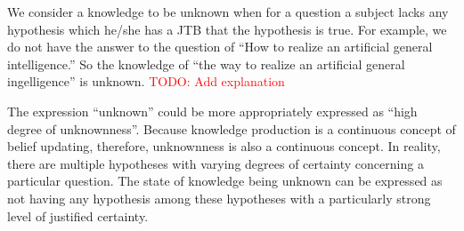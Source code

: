 We consider a knowledge to be unknown when for a question a subject lacks any hypothesis which he/she has a JTB that the hypothesis is true. For example, we do not have the answer to the question of ``How to realize an artificial general intelligence.'' So the knowledge of ``the way to realize an artificial general ingelligence'' is unknown. \textcolor{red}{TODO: Add explanation}

The expression ``unknown'' could be more appropriately expressed as ``high degree of unknownness''. Because knowledge production is a continuous concept of belief updating, therefore, unknownness is also a continuous concept. In reality, there are multiple hypotheses with varying degrees of certainty concerning a particular question. The state of knowledge being unknown can be expressed as not having any hypothesis among these hypotheses with a particularly strong level of justified certainty.



